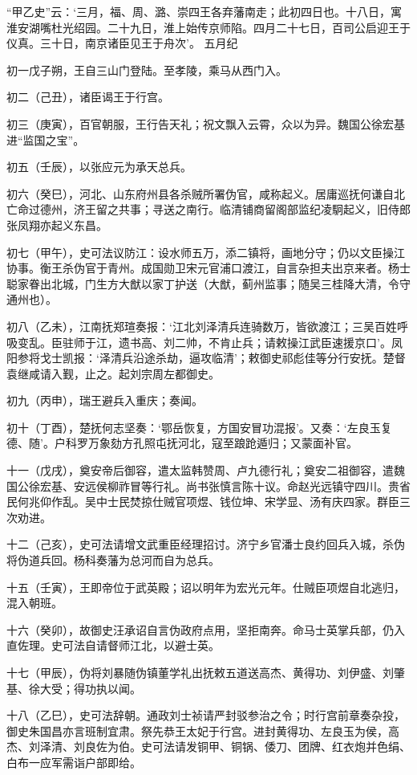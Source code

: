 \documentclass[]{article}
\begin{document}
``甲乙史''云：`三月，福、周、潞、崇四王各弃藩南走；此初四日也。十八日，寓淮安湖嘴杜光绍园。二十九日，淮上始传京师陷。四月二十七日，百司公启迎王于仪真。三十日，南京诸臣见王于舟次'。
五月纪

初一戊子朔，王自三山门登陆。至孝陵，乘马从西门入。

初二（己丑），诸臣谒王于行宫。

初三（庚寅），百官朝服，王行告天礼；祝文飘入云霄，众以为异。魏国公徐宏基进``监国之宝''。

初五（壬辰），以张应元为承天总兵。

初六（癸巳），河北、山东府州县各杀贼所署伪官，咸称起义。居庸巡抚何谦自北亡命过德州，济王留之共事；寻送之南行。临清铺商留阁部监纪凌駉起义，旧侍郎张凤翔亦起义东昌。

初七（甲午），史可法议防江：设水师五万，添二镇将，画地分守；仍以文臣操江协事。衡王杀伪官于青州。成国勋卫宋元官浦口渡江，自言杂担夫出京来者。杨士聪家眷出北城，门生方大猷以家丁护送（大猷，蓟州监事；随吴三桂降大清，令守通州也）。

初八（乙未），江南抚郑瑄奏报：`江北刘泽清兵连骑数万，皆欲渡江；三吴百姓呼吸变乱。臣驻师于江，遗书高、刘二帅，不肯止兵；请敕操江武臣速援京口'。凤阳参将戈士凯报：`泽清兵沿途杀劫，逼攻临清'；敕御史祁彪佳等分行安抚。楚督袁继咸请入觐，止之。起刘宗周左都御史。

初九（丙申），瑞王避兵入重庆；奏闻。

初十（丁酉），楚抚何志坚奏：`鄂岳恢复，方国安冒功混报'。又奏：`左良玉复德、随'。户科罗万象劾方孔照屯抚河北，寇至踉跄遁归；又蒙面补官。

十一（戊戌），奠安帝后御容，遣太监韩赞周、卢九德行礼；奠安二祖御容，遣魏国公徐宏基、安远侯柳祚冒等行礼。尚书张慎言陈十议。命赵光远镇守四川。贵省民何兆仰作乱。吴中士民焚掠仕贼官项煜、钱位坤、宋学显、汤有庆四家。群臣三次劝进。

十二（己亥），史可法请增文武重臣经理招讨。济宁乡官潘士良约回兵入城，杀伪将伪道兵回。杨科奏藩为总河而自为总兵。

十五（壬寅），王即帝位于武英殿；诏以明年为宏光元年。仕贼臣项煜自北逃归，混入朝班。

十六（癸卯），故御史汪承诏自言伪政府点用，坚拒南奔。命马士英掌兵部，仍入直佐理。史可法自请督师江北，以避士英。

十七（甲辰），伪将刘暴随伪镇董学礼出抚敕五道送高杰、黄得功、刘伊盛、刘肇基、徐大受；得功执以闻。

十八（乙巳），史可法辞朝。通政刘士祯请严封驳参治之令；时行宫前章奏杂投，御史朱国昌亦言班制宜肃。祭先恭王太妃于行宫。进封黄得功、左良玉为侯，高杰、刘泽清、刘良佐为伯。史可法请发铜甲、铜锅、倭刀、团牌、红衣炮并色绢、白布一应军需诣户部即给。
\end{document}
